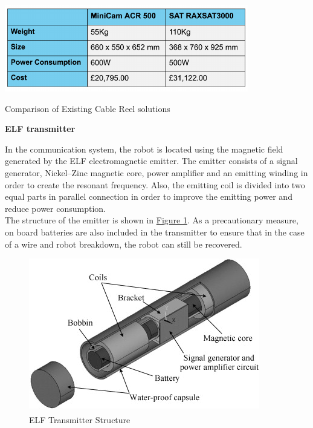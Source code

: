 \documentclass[11pt]{article}		%
\newlength{\imageheight}	 %
\newcommand{\supercite}[1]{\textsuperscript{\cite{#1}}}		%
\newcommand{\figref}[1]{\hyperref[#1]{Figure \ref*{#1}}}    %
\begin{document}
	     
	        \begin{table}[h]
				\centering
				\includegraphics[width=0.8\textwidth]{tablecables}
				\caption{Comparison of Existing Cable Reel solutions}
				\label{comparisonReels}
			\end{table}
	        
	        
	        \textbf{ELF transmitter}
	        
	        In the communication system, the robot is located using the magnetic field generated by the ELF electromagnetic emitter. 
	        The emitter consists of a signal generator, Nickel–Zinc magnetic core, power amplifier and an emitting winding in order to create the resonant frequency. 
	        Also, the emitting coil is divided into two equal parts in parallel connection in order to improve the emitting power and reduce power consumption. 
	        \\
	        \hspace*{3ex}The structure of the emitter is shown in \figref{ELFtransmitter}. 
	        As a precautionary measure, on board batteries are also included in the transmitter to ensure that in the case of a wire and robot breakdown, the robot can still be recovered.    
	        
	        \begin{figure}[h]
				\centering
				\includegraphics[height=\imageheight]{ELFtransmitter.jpg}
				\caption{ELF Transmitter Structure \supercite{ELFTransmitter}}
				\label{ELFtransmitter}
			\end{figure}
			
\end{document}
